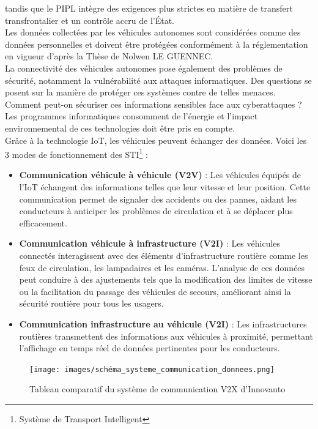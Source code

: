 tandis que le PIPL intègre des exigences plus strictes en matière de transfert transfrontalier et un contrôle accru de l’État.\\
Les données collectées par les véhicules autonomes sont considérées comme des données personnelles et doivent être protégées conformément à la réglementation en vigueur d'après la Thèse de Nolwen LE GUENNEC\cite{le_gennec_machine_2023}.\\
La connectivité des véhicules autonomes pose également des problèmes de sécurité, notamment la vulnérabilité aux attaques informatiques. Des questions se posent sur la manière de protéger ces systèmes contre de telles menaces. Comment peut-on sécuriser ces informations sensibles face aux cyberattaques ?\\
Les programmes informatiques consomment de l’énergie et l'impact environnemental de ces technologies doit être pris en compte.\\
Grâce à la technologie IoT, les véhicules peuvent échanger des données. Voici les 3 modes de fonctionnement des STI\footnote{Système de Transport Intelligent} :
\begin{itemize}
    \item \textbf{Communication véhicule à véhicule (V2V)} : Les véhicules équipés de l’IoT échangent des informations telles que leur vitesse et leur position. Cette communication permet de signaler des accidents ou des pannes, aidant les conducteurs à anticiper les problèmes de circulation et à se déplacer plus efficacement.
    \item \textbf{Communication véhicule à infrastructure (V2I)} : Les véhicules connectés interagissent avec des éléments d’infrastructure routière comme les feux de circulation, les lampadaires et les caméras. L’analyse de ces données peut conduire à des ajustements tels que la modification des limites de vitesse ou la facilitation du passage des véhicules de secours, améliorant ainsi la sécurité routière pour tous les usagers.
    \item \textbf{Communication infrastructure au véhicule (V2I)} : Les infrastructures routières transmettent des informations aux véhicules à proximité, permettant l’affichage en temps réel de données pertinentes pour les conducteurs.
\end{itemize}

\begin{figure}[H]
    \centering
    \texttt{[image: images/schéma\_systeme\_communication\_donnees.png]} 
    \caption{Tableau comparatif du système de communication V2X d'Innovauto}
\end{figure}

